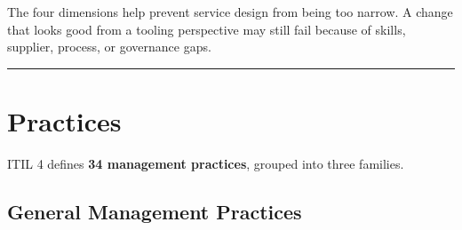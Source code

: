 \documentclass[
  letterpaper,
  DIV=11,
  numbers=noendperiod]{scrartcl}
\begin{document}
The four dimensions help prevent service design from being too narrow. A
change that looks good from a tooling perspective may still fail because
of skills, supplier, process, or governance gaps.

\begin{center}\rule{0.5\linewidth}{0.5pt}\end{center}

\section{Practices}\label{practices}

ITIL 4 defines \textbf{34 management practices}, grouped into three
families.

\subsection{General Management
Practices}\label{general-management-practices}
\end{document}
